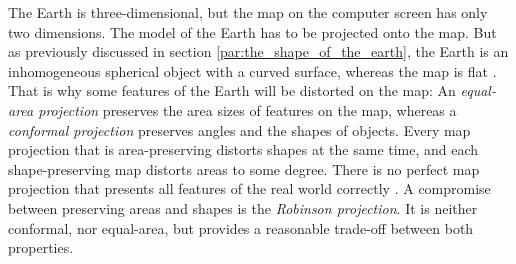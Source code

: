 The Earth is three-dimensional, but the map on the computer screen has only two dimensions. The model of the Earth has to be projected onto the map. But as previously discussed in section \ref{par:the_shape_of_the_earth}, the Earth is an inhomogeneous spherical object with a curved surface, whereas the map is flat
\cite[p.79]{bolstad2008gis}.
That is why some features of the Earth will be distorted on the map: An \emph{equal-area projection} preserves the area sizes of features on the map, whereas a \emph{conformal projection} preserves angles and the shapes of objects. Every map projection that is area-preserving distorts shapes at the same time, and each shape-preserving map distorts areas to some degree. There is no perfect map projection that presents all features of the real world correctly
\cite{mapProjectionGeokov}.
A compromise between preserving areas and shapes is the \emph{Robinson projection}. It is neither conformal, nor equal-area, but provides a reasonable trade-off between both properties.

